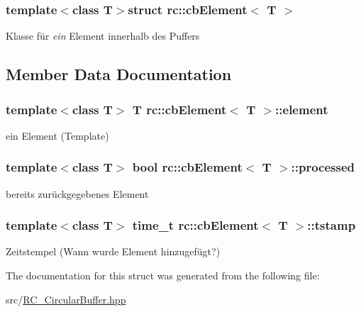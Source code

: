 \subsubsection*{template$<$class T$>$struct rc\+::cb\+Element$<$ T $>$}

Klasse für {\itshape ein} Element innerhalb des Puffers 

\subsection{Member Data Documentation}
\hypertarget{structrc_1_1cbElement_a9e0ab0b1cc53698c5aedf11997ffd261}{
\subsubsection[{element}]{\setlength{\rightskip}{0pt plus 5cm}template$<$class T$>$ T {\bf rc\+::cb\+Element}$<$ T $>$\+::element}}\label{structrc_1_1cbElement_a9e0ab0b1cc53698c5aedf11997ffd261}
ein Element (Template) \hypertarget{structrc_1_1cbElement_a721d493bd93248172628c48c4526f105}{
\subsubsection[{processed}]{\setlength{\rightskip}{0pt plus 5cm}template$<$class T$>$ bool {\bf rc\+::cb\+Element}$<$ T $>$\+::processed}}\label{structrc_1_1cbElement_a721d493bd93248172628c48c4526f105}
bereits zurückgegebenes Element \hypertarget{structrc_1_1cbElement_a96732c8c547c6cf61082007d4e31e4d7}{
\subsubsection[{tstamp}]{\setlength{\rightskip}{0pt plus 5cm}template$<$class T$>$ time\+\_\+t {\bf rc\+::cb\+Element}$<$ T $>$\+::tstamp}}\label{structrc_1_1cbElement_a96732c8c547c6cf61082007d4e31e4d7}
Zeitstempel (Wann wurde Element hinzugefügt?) 

The documentation for this struct was generated from the following file\+:\begin{DoxyCompactItemize}
\item 
src/\hyperlink{RC__CircularBuffer_8hpp}{R\+C\+\_\+\+Circular\+Buffer.\+hpp}\end{DoxyCompactItemize}

